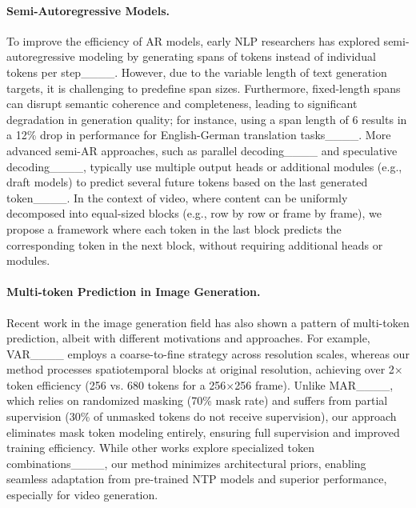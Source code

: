 \paragraph{Semi-Autoregressive Models.}
To improve the efficiency of AR models, early NLP researchers has explored semi-autoregressive modeling by generating spans of tokens instead of individual tokens per step____. However, due to the variable length of text generation targets, it is challenging to predefine span sizes. Furthermore, fixed-length spans can disrupt semantic coherence and completeness, leading to significant degradation in generation quality; for instance, using a span length of 6 results in a 12\% drop in performance for English-German translation tasks____.
More advanced semi-AR approaches, such as parallel decoding____ and speculative decoding____, typically use multiple output heads or additional modules (e.g., draft models) to predict several future tokens based on the last generated token____. 
In the context of video, where content can be uniformly decomposed into equal-sized blocks (e.g., row by row or frame by frame), we propose a framework where each token in the last block predicts the corresponding token in the next block, without requiring additional heads or modules. 


\paragraph{Multi-token Prediction in Image Generation.}
Recent work in the image generation field has also shown a pattern of multi-token prediction, albeit with different motivations and approaches. 
For example, VAR____ employs a coarse-to-fine strategy across resolution scales, whereas our method processes spatiotemporal blocks at original resolution, achieving over 2$\times$ token efficiency (256 vs. 680 tokens for a 256$\times$256 frame). 
Unlike MAR____, which relies on randomized masking (70\% mask rate) and suffers from partial supervision (30\% of unmasked tokens do not receive supervision), our approach eliminates mask token modeling entirely, ensuring full supervision and improved training efficiency. 
While other works explore specialized token combinations____, our method minimizes architectural priors, enabling seamless adaptation from pre-trained NTP models and superior performance, especially for video generation.